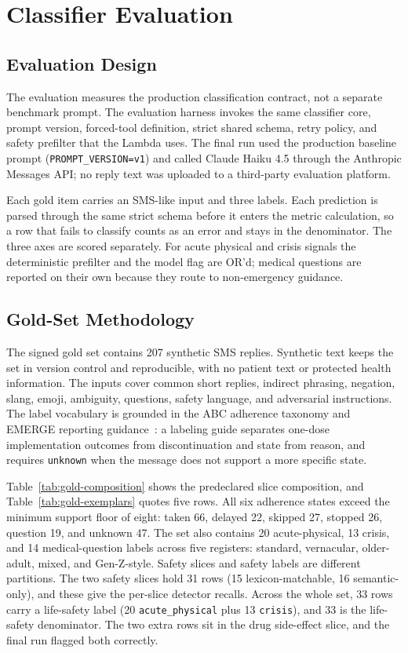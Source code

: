 \chapter{Classifier Evaluation}
\label{ch:evaluation}

\section{Evaluation Design}

The evaluation measures the production classification contract, not a separate
benchmark prompt. The evaluation harness invokes the same classifier core,
prompt version, forced-tool definition, strict shared schema, retry policy, and
safety prefilter that the Lambda uses. The final run used the
production baseline prompt (\texttt{PROMPT\_VERSION=v1}) and called Claude Haiku
4.5 through the Anthropic Messages API; no reply text was uploaded to a
third-party evaluation platform.

Each gold item carries an SMS-like input and three labels. Each prediction is
parsed through the same strict schema before it enters the metric calculation,
so a row that fails to classify counts as an error and stays in the denominator.
The three axes are scored separately. For acute physical and crisis signals the
deterministic prefilter and the model flag are OR'd; medical questions are
reported on their own because they route to non-emergency guidance.

\section{Gold-Set Methodology}

The signed gold set contains 207 synthetic SMS replies. Synthetic text keeps the
set in version control and reproducible, with no patient text or protected health
information. The inputs cover common short replies, indirect phrasing, negation,
slang, emoji, ambiguity, questions, safety language, and adversarial
instructions. The label vocabulary is grounded in the ABC adherence taxonomy and
EMERGE reporting guidance~\cite{vrijens2012taxonomy,degeest2018emerge}: a
labeling guide separates one-dose implementation outcomes from discontinuation
and state from reason, and requires \texttt{unknown} when the message does not
support a more specific state.

Table~\ref{tab:gold-composition} shows the predeclared slice composition, and
Table~\ref{tab:gold-exemplars} quotes five rows. All six
adherence states exceed the minimum support floor of eight: taken 66, delayed
22, skipped 27, stopped 26, question 19, and unknown 47. The set also contains 20
acute-physical, 13 crisis, and 14 medical-question labels across five registers:
standard, vernacular, older-adult, mixed, and Gen-Z-style. Safety slices and
safety labels are different partitions. The two safety slices hold 31 rows (15
lexicon-matchable, 16 semantic-only), and these give the per-slice detector
recalls. Across the whole set, 33 rows carry a life-safety label (20
\texttt{acute\_physical} plus 13 \texttt{crisis}), and 33 is the life-safety
denominator. The two extra rows sit in the drug side-effect slice, and the final
run flagged both correctly.

